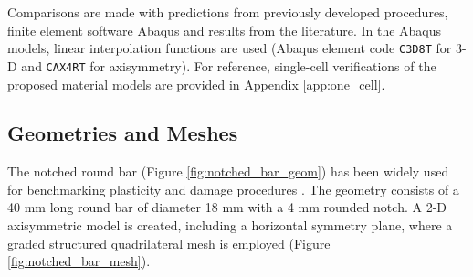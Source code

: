 \documentclass[sn-mathphys,Numbered]{sn-jnl}%
\begin{document}


Comparisons are made with predictions from previously developed procedures, finite element software Abaqus and results from the literature.
In the Abaqus models, linear interpolation functions are used (Abaqus element code \texttt{C3D8T} for 3-D and \texttt{CAX4RT} for axisymmetry).
For reference, single-cell verifications of the proposed material models are provided in Appendix \ref{app:one_cell}.





\subsection{Geometries and Meshes}
The notched round bar (Figure \ref{fig:notched_bar_geom}) has been widely used for benchmarking plasticity and damage procedures \cite{cesar_de_sa_damage_2006, fincato_return_2018, vaz_aspects_2001}.
The geometry consists of a 40 \si{\milli\meter} long round bar of diameter 18 \si{\milli\meter} with a 4 \si{\milli\meter} rounded notch.
A 2-D axisymmetric model is created, including a horizontal symmetry plane, where a graded structured quadrilateral mesh is employed (Figure \ref{fig:notched_bar_mesh}).
\end{document}
